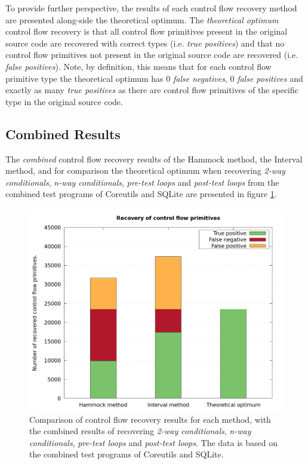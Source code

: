 To provide further perspective, the results of each control flow recovery method are presented along-side the theoretical optimum. The \textit{theoretical optimum} control flow recovery is that all control flow primitives present in the original source code are recovered with correct types (i.e. \textit{true positives}) and that no control flow primitives not present in the original source code are recovered (i.e. \textit{false positives}). Note, by definition, this means that for each control flow primitive type the theoretical optimum has 0 \textit{false negatives}, 0 \textit{false positives} and exactly as many \textit{true positives} as there are control flow primitives of the specific type in the original source code.


\clearpage

\subsection{Combined Results}

The \textit{combined} control flow recovery results of the Hammock method, the Interval method, and for comparison the theoretical optimum when recovering \textit{2-way conditionals}, \textit{n-way conditionals}, \textit{pre-test loops} and \textit{post-test loops} from the combined test programs of Coreutils and SQLite are presented in figure \ref{fig:total_results_combined}.

\begin{figure}[htbp]
	\centering
	\includegraphics[width=\textwidth]{inc/5_results/results_combined.png}
	\caption{Comparison of control flow recovery results for each method, with the combined results of recovering \textit{2-way conditionals}, \textit{n-way conditionals}, \textit{pre-test loops} and \textit{post-test loops}. The data is based on the combined test programs of Coreutils and SQLite.}
	\label{fig:total_results_combined}
\end{figure}

